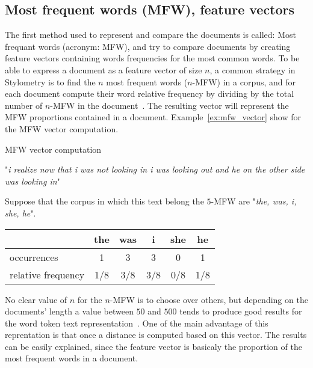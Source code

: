 \subsection{Most frequent words (MFW), feature vectors}

The first method used to represent and compare the documents is called: Most frequant words (acronym: MFW), and try to compare documents by creating feature vectors containing words frequencies for the most common words.
To be able to express a document as a feature vector of size $n$, a common strategy in Stylometry is to find the $n$ most frequent words ($n$-MFW) in a corpus, and for each document compute their word relative frequency by dividing by the total number of $n$-MFW in the document~\cite{savoy_stylo}.
The resulting vector will represent the MFW proportions contained in a document.
Example~\ref{ex:mfw_vector} show for the MFW vector computation.

\begin{example}
  \centering
  \caption{MFW vector computation}
  \label{ex:mfw_vector}

  \begin{subexample}{\linewidth}
    "\textit{i realize now that i was not looking in i was looking out and he on the other side was looking in}"\cite{ddlc}
  \end{subexample}

  \vspace{0.5cm}

  \begin{subexample}{\linewidth}
    Suppose that the corpus in which this text belong the $5$-MFW are "\textit{the, was, i, she, he}".

    \centering
    \begin{tabular}{l c c c c c}
      \toprule
                       & the & was & i   & she & he  \\
      \midrule
      occurrences         & 1   & 3   & 3   & 0   & 1   \\
      relative frequency & 1/8 & 3/8 & 3/8 & 0/8 & 1/8 \\
      \bottomrule
    \end{tabular}
  \end{subexample}
\end{example}

No clear value of $n$ for the $n$-MFW is to choose over others, but depending on the documents' length a value between $50$ and $500$ tends to produce good results for the word token text representation~\cite{savoy_text_representation}.
One of the main advantage of this reprentation is that once a distance is computed based on this vector. The results can be easily explained, since the feature vector is basicaly the proportion of the most frequent words in a document.

